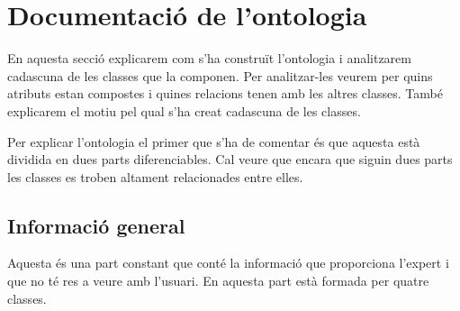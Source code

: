 \documentclass[11pt,a4paper]{article}
\begin{document}
\clearpage


\section{Documentació de l'ontologia}%
\label{sec:ontologia}
En aquesta secció explicarem com s'ha construït l'ontologia i analitzarem cadascuna de les classes que la componen. Per analitzar-les veurem per quins atributs estan compostes i quines relacions tenen amb les altres classes. També explicarem el motiu pel qual s'ha creat cadascuna de les classes.

Per explicar l'ontologia el primer que s'ha de comentar és que aquesta està dividida en dues parts diferenciables. Cal veure que encara que siguin dues parts les classes es troben altament relacionades entre elles.

\subsection{Informació general}
Aquesta és una part constant que conté la informació que proporciona l'expert i que no té res a veure amb l'usuari. En aquesta part està formada per quatre classes.
\end{document}
